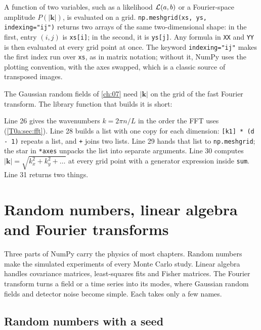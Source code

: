 A function of two variables, such as a likelihood $\mathcal{L}(a,b)$ or a Fourier-space amplitude $P(|\bm k|)$, is evaluated on a grid. \texttt{np.meshgrid(xs, ys, indexing="ij")} returns two arrays of the same two-dimensional shape: in the first, entry $(i,j)$ is \texttt{xs[i]}; in the second, it is \texttt{ys[j]}. Any formula in \texttt{XX} and \texttt{YY} is then evaluated at every grid point at once. The keyword \texttt{indexing="ij"} makes the first index run over \texttt{xs}, as in matrix notation; without it, NumPy uses the plotting convention, with the axes swapped, which is a classic source of transposed images.


The Gaussian random fields of \cref{ch:07} need $|\bm k|$ on the grid of the fast Fourier transform. The library function that builds it is short:


Line 26 gives the wavenumbers $k=2\pi n/L$ in the order the FFT uses (\cref{T0a:sec:fft}). Line 28 builds a list with one copy for each dimension: \texttt{[k1] * (d - 1)} repeats a list, and \texttt{+} joins two lists. Line 29 hands that list to \texttt{np.meshgrid}; the star in \texttt{*axes} unpacks the list into separate arguments. Line 30 computes $|\bm k|=\sqrt{k_x^2+k_y^2+\dots}$ at every grid point with a generator expression inside \texttt{sum}. Line 31 returns two things.
\section{Random numbers, linear algebra and Fourier transforms}
\label{T0a:sec:numpy-more}

Three parts of NumPy carry the physics of most chapters. Random numbers make the simulated experiments of every Monte Carlo study. Linear algebra handles covariance matrices, least-squares fits and Fisher matrices. The Fourier transform turns a field or a time series into its modes, where Gaussian random fields and detector noise become simple. Each takes only a few names.

\subsection{Random numbers with a seed}
\label{T0a:sec:random}

